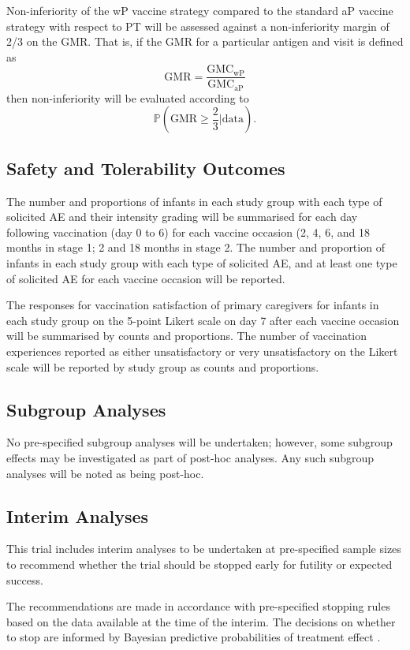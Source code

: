 \documentclass{bmcart}
\begin{document}
Non-inferiority of the wP vaccine strategy compared to the standard aP vaccine strategy with respect to PT will be assessed against a non-inferiority margin of 2/3 on the GMR.
That is, if the GMR for a particular antigen and visit is defined as
$$
\text{GMR} = \frac{\text{GMC}_\text{wP}}{\text{GMC}_\text{aP}}
$$ 
then non-inferiority will be evaluated according to
$$
\mathbb P\left(\text{GMR}\geq \frac{2}{3}\Big\vert \text{data}\right).
$$


\subsection*{Safety and Tolerability Outcomes}

The number and proportions of infants in each study group with each type of solicited AE and their intensity grading will be summarised for each day following vaccination (day 0 to 6) for each vaccine occasion (2, 4, 6, and 18 months in stage 1; 2 and 18 months in stage 2.
The number and proportion of infants in each study group with each type of solicited AE, and at least one type of solicited AE for each vaccine occasion will be reported.

The responses for vaccination satisfaction of primary caregivers for infants in each study group on the 5-point Likert scale on day 7 after each vaccine occasion will be summarised by counts and proportions.
The number of vaccination experiences reported as either unsatisfactory or very unsatisfactory on the Likert scale will be reported by study group as counts and proportions.

\subsection*{Subgroup Analyses}

No pre-specified subgroup analyses will be undertaken; however, some subgroup effects may be investigated as part of post-hoc analyses.
Any such subgroup analyses will be noted as being post-hoc.

\subsection*{Interim Analyses}

This trial includes interim analyses to be undertaken at pre-specified sample sizes to recommend whether the trial should be stopped early for futility or expected success.

The recommendations are made in accordance with pre-specified stopping rules based on the data available at the time of the interim.
The decisions on whether to stop are informed by Bayesian predictive probabilities of treatment effect \cite{spiegelhalter2004bayesian}.
\end{document}
